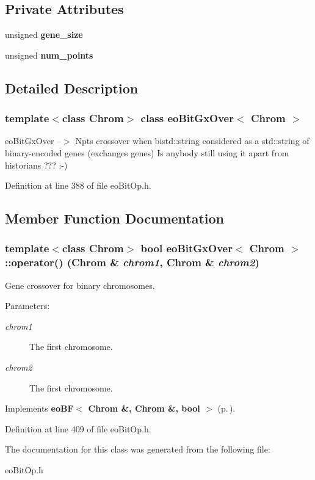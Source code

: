 \subsection*{Private Attributes}
\begin{CompactItemize}
\item 
unsigned {\bf gene\_\-size}\label{classeo_bit_gx_over_r0}

\item 
unsigned {\bf num\_\-points}\label{classeo_bit_gx_over_r1}

\end{CompactItemize}


\subsection{Detailed Description}
\subsubsection*{template$<$class Chrom$>$ class eo\-Bit\-Gx\-Over$<$ Chrom $>$}

eo\-Bit\-Gx\-Over --$>$ Npts crossover when bistd::string considered as a std::string of binary-encoded genes (exchanges genes) Is anybody still using it apart from historians ??? :-) 



Definition at line 388 of file eo\-Bit\-Op.h.

\subsection{Member Function Documentation}
\subsubsection{\setlength{\rightskip}{0pt plus 5cm}template$<$class Chrom$>$ bool {\bf eo\-Bit\-Gx\-Over}$<$ Chrom $>$::operator() (Chrom \& {\em chrom1}, Chrom \& {\em chrom2})\hspace{0.3cm}{\tt  [inline, virtual]}}\label{classeo_bit_gx_over_a2}


Gene crossover for binary chromosomes. 

\begin{Desc}
\item[Parameters:]
\begin{description}
\item[{\em chrom1}]The first chromosome. \item[{\em chrom2}]The first chromosome. \end{description}
\end{Desc}


Implements {\bf eo\-BF$<$ Chrom \&, Chrom \&, bool $>$} {\rm (p.\,\pageref{classeo_b_f_a1})}.

Definition at line 409 of file eo\-Bit\-Op.h.

The documentation for this class was generated from the following file:\begin{CompactItemize}
\item 
eo\-Bit\-Op.h\end{CompactItemize}
